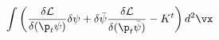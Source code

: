 \begin{equation}
   \int\left(\frac{\delta{\cal L}}{\delta(\p_{t}\psi)}\delta\psi
  +\delta\bar{\psi}\frac{\delta{\cal L}}{\delta(\p_{t}\bar{\psi})}
     -K^{t}\right)d^2\vx
\label{Noether}
\end{equation}


